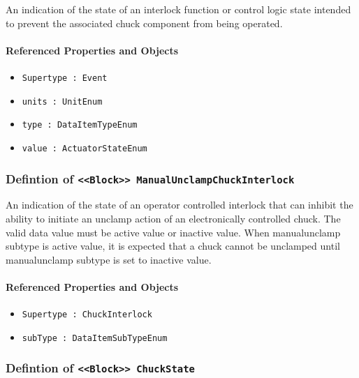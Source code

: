 \FloatBarrier

An indication of the state of an interlock function or control logic state intended to prevent the associated chuck component from being operated.

\FloatBarrier
\paragraph{Referenced Properties and Objects}

\begin{itemize}
\item \texttt{Supertype : Event}

\item \texttt{units : UnitEnum}

\item \texttt{type : DataItemTypeEnum}

\item \texttt{value : ActuatorStateEnum}

\end{itemize}
\FloatBarrier
\subsubsection{Defintion of \texttt{<<Block>> ManualUnclampChuckInterlock}}
  \label{type:ManualUnclampChuckInterlock}

\FloatBarrier

An indication of the state of an operator controlled interlock that can inhibit the ability to initiate an unclamp action of an electronically controlled chuck.
 The valid data value must be active value or inactive value. 
 When manualunclamp subtype is active value, it is expected that a chuck cannot be unclamped until manualunclamp subtype is set to inactive value. 

\FloatBarrier
\paragraph{Referenced Properties and Objects}

\begin{itemize}
\item \texttt{Supertype : ChuckInterlock}

\item \texttt{subType : DataItemSubTypeEnum}

\end{itemize}
\FloatBarrier
\subsubsection{Defintion of \texttt{<<Block>> ChuckState}}
  \label{type:ChuckState}

